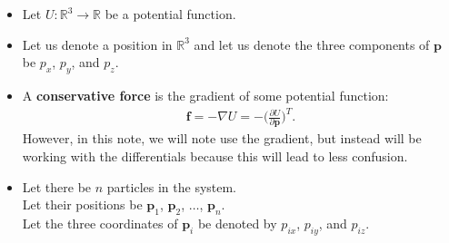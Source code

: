 \documentclass[10pt]{article}
\newcommand{\ve}[1]{\mathbf{#1}}
\newcommand{\ra}{\rightarrow}
\newcommand{\Real}{\mathbb{R}}
\begin{document}
  \begin{itemize}
    \item Let $U: \Real^3 \ra \Real$ be a potential function.

    \item Let us denote a position in $\Real^3$ and let us denote the three components of $\ve{p}$ be $p_x$, $p_y$, and $p_z$.    
    
    \item A {\bf conservative force} is the gradient of some potential function:
    \begin{align*}
      \ve{f} = -\nabla U = - \bigg( \frac{\partial U}{\partial \ve{p}} \bigg)^T.
    \end{align*}
    However, in this note, we will note use the gradient, but instead will be working with the differentials because this will lead to less confusion.

    \item Let there be $n$ particles in the system.\\
    Let their positions be $\ve{p}_1$, $\ve{p}_2$, $\dotsc$, $\ve{p}_n$.\\
    Let the three coordinates of $\ve{p}_i$ be denoted by $p_{ix}$, $p_{iy}$, and $p_{iz}$.


\end{itemize}
\end{document}
